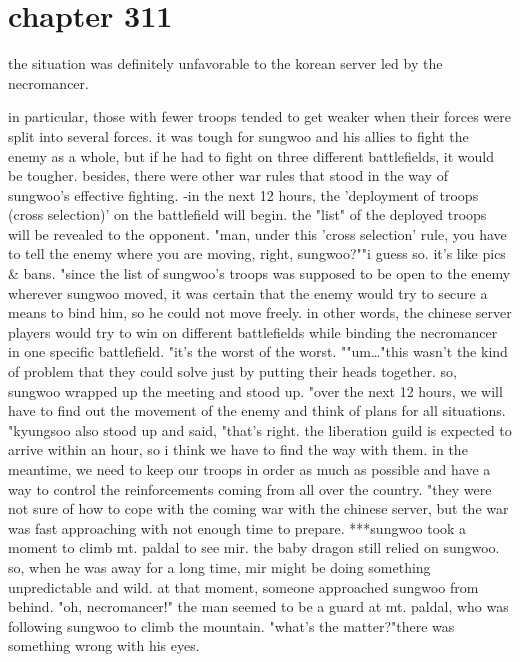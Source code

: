 \section{chapter 311}

the situation was definitely unfavorable to the korean server led by the necromancer.





in particular, those with fewer troops tended to get weaker when their forces were split into several forces.
it was tough for sungwoo and his allies to fight the enemy as a whole, but if he had to fight on three different battlefields, it would be tougher.
 besides, there were other war rules that stood in the way of sungwoo's effective fighting.
-in the next 12 hours, the 'deployment of troops (cross selection)' on the battlefield will begin.
 the "list" of the deployed troops will be revealed to the opponent.
"man, under this 'cross selection' rule, you have to tell the enemy where you are moving, right, sungwoo?""i guess so.
 it's like pics & bans.
"since the list of sungwoo's troops was supposed to be open to the enemy wherever sungwoo moved, it was certain that the enemy would try to secure a means to bind him, so he could not move freely.
 in other words, the chinese server players would try to win on different battlefields while binding the necromancer in one specific battlefield.
"it's the worst of the worst.
""um…"this wasn't the kind of problem that they could solve just by putting their heads together.
 so, sungwoo wrapped up the meeting and stood up.
"over the next 12 hours, we will have to find out the movement of the enemy and think of plans for all situations.
"kyungsoo also stood up and said, "that's right.
 the liberation guild is expected to arrive within an hour, so i think we have to find the way with them.
 in the meantime, we need to keep our troops in order as much as possible and have a way to control the reinforcements coming from all over the country.
"they were not sure of how to cope with the coming war with the chinese server, but the war was fast approaching with not enough time to prepare.
***sungwoo took a moment to climb mt.
 paldal to see mir.
the baby dragon still relied on sungwoo.
 so, when he was away for a long time, mir might be doing something unpredictable and wild.
at that moment, someone approached sungwoo from behind.
"oh, necromancer!"
the man seemed to be a guard at mt.
 paldal, who was following sungwoo to climb the mountain.
"what's the matter?"there was something wrong with his eyes.
